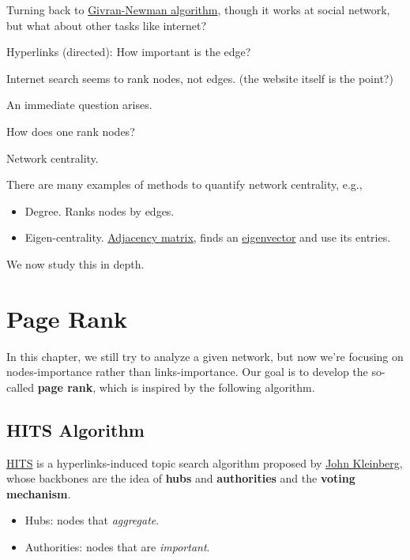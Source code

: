 \begin{prev}
	Turning back to \hyperref[algo:Girvan-Newman-algorithm]{Givran-Newman algorithm}, though it works at social network, but what about other tasks like internet?
	\begin{problem}
	Hyperlinks (directed): How important is the edge?
	\end{problem}
	\begin{answer}
		Internet search seems to rank nodes, not edges. (the website itself is the point?)
	\end{answer}

	An immediate question arises.

	\begin{problem}
	How does one rank nodes?
	\end{problem}
	\begin{answer}
		Network centrality.
	\end{answer}
\end{prev}
\begin{eg}
	There are many examples of methods to quantify network centrality, e.g.,
	\begin{itemize}
		\item Degree. Ranks nodes by edges.
		\item Eigen-centrality. \hyperref[def:adjacency-matrix]{Adjacency matrix}, finds an \hyperref[def:eigenvector]{eigenvector} and use its entries.
	\end{itemize}
\end{eg}

We now study this in depth.

\chapter{Page Rank}
In this chapter, we still try to analyze a given network, but now we're focusing on nodes-importance rather than links-importance. Our goal is to develop the so-called \textbf{page rank}, which is inspired by the following algorithm.

\section{HITS Algorithm}
\hyperref[algo:HITS-algorithm]{HITS} is a hyperlinks-induced topic search algorithm proposed by \href{https://en.wikipedia.org/wiki/Jon_Kleinberg}{John Kleinberg}, whose backbones are the idea of \textbf{hubs} and \textbf{authorities} and the \textbf{voting mechanism}.
\begin{itemize}
	\item Hubs: nodes that \emph{aggregate}.
	\item Authorities: nodes that are \emph{important}.
\end{itemize}

